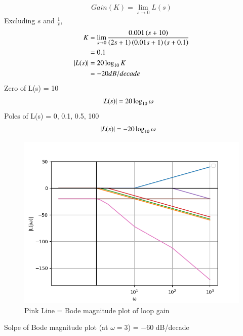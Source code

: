 \documentclass[journal,12pt,twocolumn]{IEEEtran}
\theoremstyle{remark}
\begin{document}
\begin{align}
    Gain(K) = \lim_{s\rightarrow 0} L(s)
\end{align}
Excluding $s$ and $\frac{1}{s}$,
\begin{align}
    K &= \lim_{s\rightarrow 0} \frac{0.001\left(s+10\right)}{\left(2s+1\right)\left(0.01s+1\right)\left(s+0.1\right)}\\
    &= 0.1\\
    \left\vert L(s)\right\vert &= 20\log_{10} K\\
    &= -20 dB/decade
\end{align}
Zero of L(s) = 10
\begin{align}
    \left\vert L(s)\right\vert &= 20\log_{10} \omega
\end{align}
Poles of L(s) = 0, 0.1, 0.5, 100
\begin{align}
    \left\vert L(s)\right\vert &= -20\log_{10} \omega
\end{align}
\begin{figure}[!h]
    \centering
    \includegraphics[width=\columnwidth]{figs/bode_mag_plot.png}
    \caption{Pink Line = Bode magnitude plot of loop gain}
\end{figure}
Solpe of Bode magnitude plot (at $\omega=3$) = $-60$ dB/decade
\end{document}
